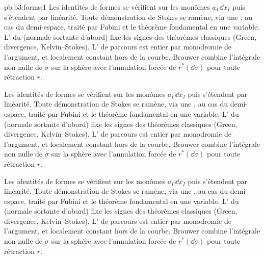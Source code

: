 \begin{solution}{pb:b3:forms:1}
Les identités de formes se vérifient sur les monômes $a_I\,\dd x_I$
puis s'étendent par linéarité. Toute démonstration de Stokes
se ramène, via une , au cas du demi-espace,
traité par Fubini et le théorème fondamental en une variable.
L' du  (normale sortante d'abord) fixe les signes
des théorèmes classiques (Green, divergence, Kelvin--Stokes).
L' de parcours est entier par monodromie de l'argument,
et localement constant hors de la courbe. Brouwer combine
l'intégrale non nulle de $\sigma$ sur la sphère avec l'annulation
forcée de $r^*(\dd\sigma)$ pour toute rétraction $r$.

Les identités de formes se vérifient sur les monômes $a_I\,\dd x_I$
puis s'étendent par linéarité. Toute démonstration de Stokes
se ramène, via une , au cas du demi-espace,
traité par Fubini et le théorème fondamental en une variable.
L' du  (normale sortante d'abord) fixe les signes
des théorèmes classiques (Green, divergence, Kelvin--Stokes).
L' de parcours est entier par monodromie de l'argument,
et localement constant hors de la courbe. Brouwer combine
l'intégrale non nulle de $\sigma$ sur la sphère avec l'annulation
forcée de $r^*(\dd\sigma)$ pour toute rétraction $r$.

Les identités de formes se vérifient sur les monômes $a_I\,\dd x_I$
puis s'étendent par linéarité. Toute démonstration de Stokes
se ramène, via une , au cas du demi-espace,
traité par Fubini et le théorème fondamental en une variable.
L' du  (normale sortante d'abord) fixe les signes
des théorèmes classiques (Green, divergence, Kelvin--Stokes).
L' de parcours est entier par monodromie de l'argument,
et localement constant hors de la courbe. Brouwer combine
l'intégrale non nulle de $\sigma$ sur la sphère avec l'annulation
forcée de $r^*(\dd\sigma)$ pour toute rétraction $r$.


\end{solution}
